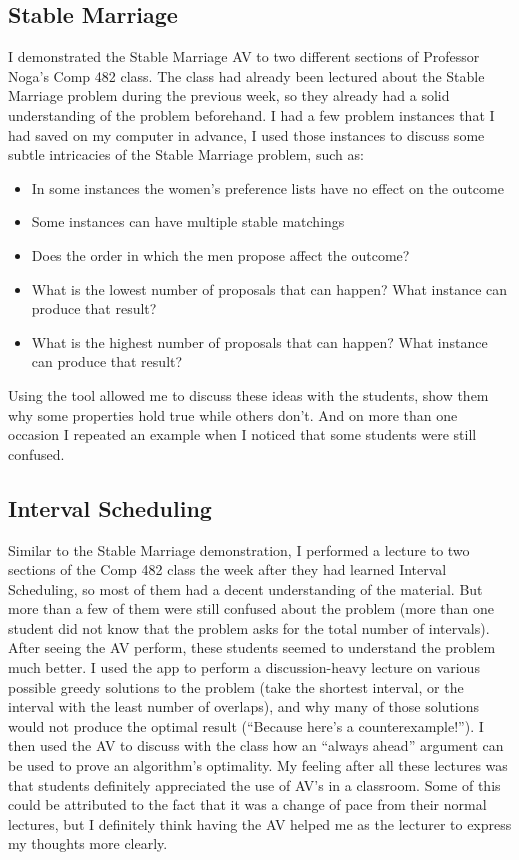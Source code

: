 \subsection{Stable Marriage}
\hspace{-0.26in}
I demonstrated the Stable Marriage AV to two different sections of Professor Noga's 
Comp 482 class. 
The class had already been lectured about the Stable Marriage problem during the previous week, 
so they already had a solid understanding of the problem beforehand. 
I had a few problem instances that I had saved on my computer in advance, 
I used those instances to discuss some subtle intricacies of the Stable Marriage problem, 
such as:
\begin{itemize}
	\item In some instances the women's preference lists have no effect on the outcome
	\item Some instances can have multiple stable matchings
	\item Does the order in which the men propose affect the outcome?
	\item What is the lowest number of proposals that can happen? What instance can produce that result?
	\item What is the highest number of proposals that can happen? What instance can produce that result?
\end{itemize} 
Using the tool allowed me to discuss these ideas with the students, 
show them why some properties hold true while others don't. 
And on more than one occasion I repeated an example when I noticed
that some students were still confused.
\subsection{Interval Scheduling}
\hspace{-0.26in}
Similar to the Stable Marriage demonstration, I performed a lecture 
to two sections of the Comp 482 class the week after they had learned 
Interval Scheduling, so most of them had a decent understanding of the material. 
But more than a few of them were 
still confused about the problem (more than one student did not 
know that the problem asks for the total number of intervals).
After seeing the AV perform, these students seemed to understand the problem 
much better. 
\newline\newline
I used the app to perform a discussion-heavy lecture on 
various possible greedy solutions to the problem 
(take the shortest interval, or the interval with the least number of overlaps), 
and why many of those solutions would not produce the optimal result 
(``Because here's a counterexample!'').
I then used the AV to discuss with the class how an ``always ahead'' 
argument can be used to prove an algorithm's optimality. 
\newline\newline
My feeling after all these lectures was that students definitely appreciated 
the use of AV's in a classroom. Some of this could be attributed to 
the fact that it was a change of pace from their normal lectures, but 
I definitely think having the AV helped me as the lecturer to 
express my thoughts more clearly. 
